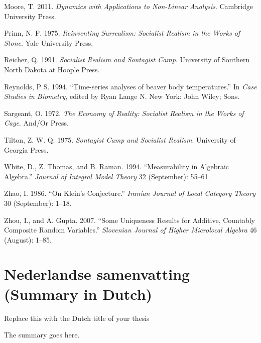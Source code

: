 \documentclass[10pt,english,]{book} %
\newenvironment{dutch}[2][]{\begin{otherlanguage}{dutch}}{\end{otherlanguage}}
\theoremstyle{definition}
\theoremstyle{definition}
\theoremstyle{definition}
\theoremstyle{remark}
\begin{document}
\leavevmode\hypertarget{ref-cite:18}{}%
Moore, T. 2011. \emph{Dynamics with Applications to Non-Linear Analysis}. Cambridge University Press.

\leavevmode\hypertarget{ref-Prinn1975}{}%
Prinn, N. F. 1975. \emph{Reinventing Surrealism: Socialist Realism in the Works of Stone}. Yale University Press.

\leavevmode\hypertarget{ref-Reicher1991}{}%
Reicher, Q. 1991. \emph{Socialist Realism and Sontagist Camp}. University of Southern North Dakota at Hoople Press.

\leavevmode\hypertarget{ref-Reynolds1994}{}%
Reynolds, P S. 1994. ``Time-series analyses of beaver body temperatures.'' In \emph{Case Studies in Biometry}, edited by Ryan Lange N. New York: John Wiley; Sons.

\leavevmode\hypertarget{ref-Sargeant1972}{}%
Sargeant, O. 1972. \emph{The Economy of Reality: Socialist Realism in the Works of Cage}. And/Or Press.

\leavevmode\hypertarget{ref-Tilton1975}{}%
Tilton, Z. W. Q. 1975. \emph{Sontagist Camp and Socialist Realism}. University of Georgia Press.

\leavevmode\hypertarget{ref-cite:31}{}%
White, D., Z. Thomas, and B. Raman. 1994. ``Measurability in Algebraic Algebra.'' \emph{Journal of Integral Model Theory} 32 (September): 55--61.

\leavevmode\hypertarget{ref-cite:9}{}%
Zhao, I. 1986. ``On Klein's Conjecture.'' \emph{Iranian Journal of Local Category Theory} 30 (September): 1--18.

\leavevmode\hypertarget{ref-cite:22}{}%
Zhou, I., and A. Gupta. 2007. ``Some Uniqueness Results for Additive, Countably Composite Random Variables.'' \emph{Slovenian Journal of Higher Microlocal Algebra} 46 (August): 1--85.

\endgroup

\hypertarget{nederlandse-samenvatting-summary-in-dutch}{%
\chapter*{Nederlandse samenvatting (Summary in Dutch)}\label{nederlandse-samenvatting-summary-in-dutch}}


\begin{dutch}

\emph{Replace this with the Dutch title of your thesis}

\bigskip

The summary goes here.

\end{dutch}
\end{document}
